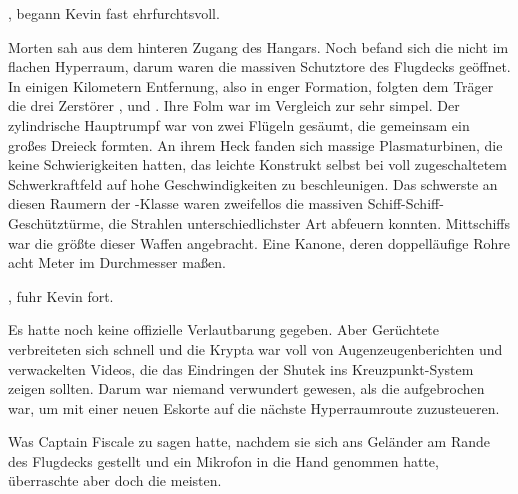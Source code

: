 , begann Kevin fast ehrfurchtsvoll. 

\par

Morten sah aus dem hinteren Zugang des Hangars. Noch befand sich die  nicht im flachen Hyperraum, darum waren die massiven Schutztore des Flugdecks geöffnet. In einigen Kilometern Entfernung, also in enger Formation, folgten dem Träger die drei Zerstörer ,  und . Ihre Folm war im Vergleich zur  sehr simpel. Der zylindrische Hauptrumpf war von zwei Flügeln gesäumt, die gemeinsam ein großes Dreieck formten. An ihrem Heck fanden sich massige Plasmaturbinen, die keine Schwierigkeiten hatten, das leichte Konstrukt selbst bei voll zugeschaltetem Schwerkraftfeld auf hohe Geschwindigkeiten zu beschleunigen. Das schwerste an diesen Raumern der -Klasse waren zweifellos die massiven Schiff-Schiff-Geschütztürme, die Strahlen unterschiedlichster Art abfeuern konnten. Mittschiffs war die größte dieser Waffen angebracht. Eine Kanone, deren doppelläufige Rohre acht Meter im Durchmesser maßen.

\par

, fuhr Kevin fort. 

\par

 Es hatte noch keine offizielle Verlautbarung gegeben. Aber Gerüchtete verbreiteten sich schnell und die Krypta war voll von Augenzeugenberichten und verwackelten Videos, die das Eindringen der Shutek ins Kreuzpunkt-System zeigen sollten. Darum war niemand verwundert gewesen, als die  aufgebrochen war, um mit einer neuen Eskorte auf die nächste Hyperraumroute zuzusteueren.

\par

Was Captain Fiscale zu sagen hatte, nachdem sie sich ans Geländer am Rande des Flugdecks gestellt und ein Mikrofon in die Hand genommen hatte, überraschte aber doch die meisten.

\par

